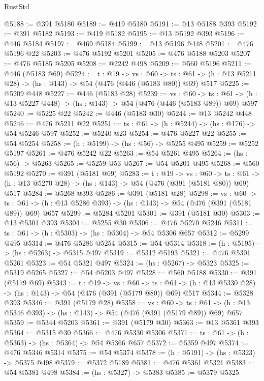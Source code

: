 \begin{lexlean}{RustStd}
\begin{coremodule}
@5188 := @391 @5180
@5189 := @419 @5180
@5191 := @13 @5188 @393
@5192 := @391 @5182
@5193 := @419 @5182
@5195 := @13 @5192 @393
@5196 := @446 @5184
@5197 := @469 @5184
@5199 := @13 @5196 @448
@5201 := @476 @5196 @22
@5203 := @476 @5192 @5201
@5205 := @476 @5188 @5203
@5207 := @476 @5185 @5205
@5208 := @2242 @498
@5209 := @560 @5196
@5211 := @446 (@5183 @69)
@5224 := {t : @19} ->
  {vs : @60} ->
  {ts : @61} -> (h : @13 @5211 @28) -> (hs : @143) -> @54 (@476 (@446 (@5183 @80)) @69) @517
@5225 := @5209 @448
@5227 := @446 (@5183 @28)
@5239 := {vs : @60} ->
  {ts : @61} -> (h : @13 @5227 @448) -> (hs : @143) -> @54 (@476 (@446 (@5183 @89)) @69) @597
@5240 := @5225 @22
@5242 := @446 (@5183 @30)
@5244 := @13 @5242 @448
@5246 := @476 @5211 @22
@5251 := {ts : @61} -> (h : @5244) -> (hs : @176) -> @54 @5246 @597
@5252 := @5240 @23
@5254 := @476 @5227 @22
@5255 := @54 @5254
@5258 := (h : @5199) -> (hs : @56) -> @5255 @495
@5259 := @5252 @5197
@5261 := @476 @5242 @22
@5263 := @54 @5261 @495
@5264 := (hs : @56) -> @5263
@5265 := @5259 @53
@5267 := @54 @5201 @495
@5268 := @560 @5192
@5270 := @391 (@5181 @69)
@5283 := {t : @19} ->
  {vs : @60} ->
  {ts : @61} -> (h : @13 @5270 @28) -> (hs : @143) -> @54 (@476 (@391 (@5181 @80)) @69) @517
@5284 := @5268 @393
@5286 := @391 (@5181 @28)
@5298 := {vs : @60} ->
  {ts : @61} -> (h : @13 @5286 @393) -> (hs : @143) -> @54 (@476 (@391 (@5181 @89)) @69) @657
@5299 := @5284 @5201
@5301 := @391 (@5181 @30)
@5303 := @13 @5301 @393
@5304 := @5255 @30
@5306 := @476 @5270 @5246
@5311 := {ts : @61} -> (h : @5303) -> (hs : @5304) -> @54 @5306 @657
@5312 := @5299 @495
@5314 := @476 @5286 @5254
@5315 := @54 @5314
@5318 := (h : @5195) -> (hs : @5263) -> @5315 @497
@5319 := @5312 @5193
@5321 := @476 @5301 @5261
@5323 := @54 @5321 @497
@5324 := (hs : @5267) -> @5323
@5325 := @5319 @5265
@5327 := @54 @5203 @497
@5328 := @560 @5188
@5330 := @391 (@5179 @69)
@5343 := {t : @19} ->
  {vs : @60} ->
  {ts : @61} -> (h : @13 @5330 @28) -> (hs : @143) -> @54 (@476 (@391 (@5179 @80)) @69) @517
@5344 := @5328 @393
@5346 := @391 (@5179 @28)
@5358 := {vs : @60} ->
  {ts : @61} -> (h : @13 @5346 @393) -> (hs : @143) -> @54 (@476 (@391 (@5179 @89)) @69) @657
@5359 := @5344 @5203
@5361 := @391 (@5179 @30)
@5363 := @13 @5361 @393
@5364 := @5315 @30
@5366 := @476 @5330 @5306
@5371 := {ts : @61} -> (h : @5363) -> (hs : @5364) -> @54 @5366 @657
@5372 := @5359 @497
@5374 := @476 @5346 @5314
@5375 := @54 @5374
@5378 := (h : @5191) -> (hs : @5323) -> @5375 @498
@5379 := @5372 @5189
@5381 := @476 @5361 @5321
@5383 := @54 @5381 @498
@5384 := (hs : @5327) -> @5383
@5385 := @5379 @5325

\end{coremodule}
\end{lexlean}
